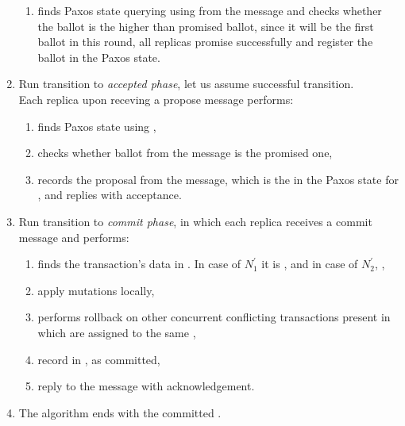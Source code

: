 \begin{enumerate}
  \begin{enumerate}
  	\item finds Paxos state querying \txIndex using \txState from the message and checks whether the ballot is the higher than promised ballot, since it will be the first ballot in this round, all replicas promise successfully and register the ballot in the Paxos state.
  \end{enumerate}

\item Run transition to \emph{accepted phase}, let us assume successful transition. \\
	Each replica upon receving a propose message performs:

	\begin{enumerate}
		\item finds Paxos state using \txState,
		\item checks whether ballot from the message is the promised one,
		\item records the proposal from the message, which is the \txState in the Paxos state for \transaction, and replies with acceptance.
	\end{enumerate}

\item Run transition to \emph{commit phase}, in which each replica receives a commit message and performs:

	\begin{enumerate}
		\item finds the transaction's data in \txStorage. In case of $N^'_1$ it is , and in case of $N^'_2$,  ,
		\item apply mutations locally,
		\item performs rollback on other concurrent conflicting transactions present in \conflictingTxSet which are assigned to the same ,
		\item record \txState in \txLog, as committed,
		\item reply to the message with acknowledgement.
	\end{enumerate}

\item The algorithm ends with the committed \transaction.

\end{enumerate}

